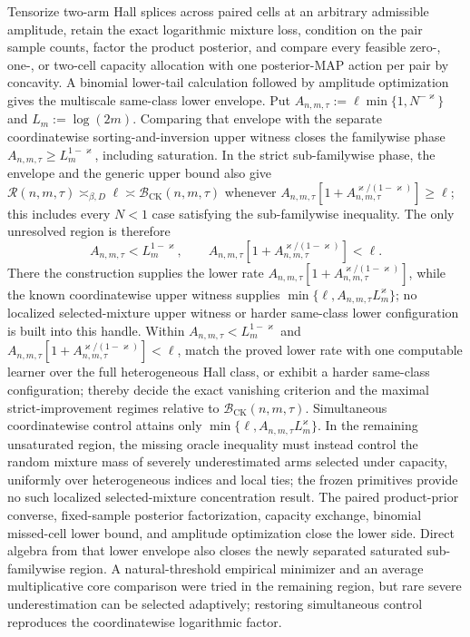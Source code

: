 Tensorize two-arm Hall splices across paired cells at an arbitrary admissible amplitude, retain the exact logarithmic mixture loss, condition on the pair sample counts, factor the product posterior, and compare every feasible zero-, one-, or two-cell capacity allocation with one posterior-MAP action per pair by concavity. A binomial lower-tail calculation followed by amplitude optimization gives the multiscale same-class lower envelope. Put \(A_{n,m,\tau}:=\ell\min\{1,N^{-\varkappa}\}\) and \(L_m:=\log(2m)\). Comparing that envelope with the separate coordinatewise sorting-and-inversion upper witness closes the familywise phase \(A_{n,m,\tau}\ge L_m^{1-\varkappa}\), including saturation. In the strict sub-familywise phase, the envelope and the generic upper bound also give \(\mathcal R(n,m,\tau)\asymp_{\beta,D}\ell\asymp\mathcal B_{\mathrm{CK}}(n,m,\tau)\) whenever \(A_{n,m,\tau}[1+A_{n,m,\tau}^{\varkappa/(1-\varkappa)}]\ge\ell\); this includes every \(N<1\) case satisfying the sub-familywise inequality. The only unresolved region is therefore
\[
A_{n,m,\tau}<L_m^{1-\varkappa},
\qquad
A_{n,m,\tau}\left[1+A_{n,m,\tau}^{\varkappa/(1-\varkappa)}\right]<\ell.
\]
There the construction supplies the lower rate \(A_{n,m,\tau}[1+A_{n,m,\tau}^{\varkappa/(1-\varkappa)}]\), while the known coordinatewise upper witness supplies \(\min\{\ell,A_{n,m,\tau}L_m^{\varkappa}\}\); no localized selected-mixture upper witness or harder same-class lower configuration is built into this handle.
Within \(A_{n,m,\tau}<L_m^{1-\varkappa}\) and \(A_{n,m,\tau}[1+A_{n,m,\tau}^{\varkappa/(1-\varkappa)}]<\ell\), match the proved lower rate with one computable learner over the full heterogeneous Hall class, or exhibit a harder same-class configuration; thereby decide the exact vanishing criterion and the maximal strict-improvement regimes relative to \(\mathcal B_{\mathrm{CK}}(n,m,\tau)\).
Simultaneous coordinatewise control attains only \(\min\{\ell,A_{n,m,\tau}L_m^{\varkappa}\}\). In the remaining unsaturated region, the missing oracle inequality must instead control the random mixture mass of severely underestimated arms selected under capacity, uniformly over heterogeneous indices and local ties; the frozen primitives provide no such localized selected-mixture concentration result.
The paired product-prior converse, fixed-sample posterior factorization, capacity exchange, binomial missed-cell lower bound, and amplitude optimization close the lower side. Direct algebra from that lower envelope also closes the newly separated saturated sub-familywise region. A natural-threshold empirical minimizer and an average multiplicative core comparison were tried in the remaining region, but rare severe underestimation can be selected adaptively; restoring simultaneous control reproduces the coordinatewise logarithmic factor.
